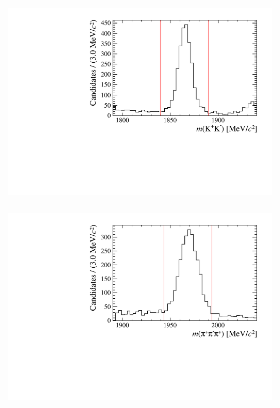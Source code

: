 \begin{figure}[!h]
   \begin{subfigure}[t]{1.0\textwidth}
   \centering
     \begin{subfigure}[t]{0.35\textwidth}
        \centering
        \includegraphics[width=1.0\textwidth]{figs/Selection/Phimass_PiPiPi_B2DsD0.pdf}
     \end{subfigure}
     \begin{subfigure}[t]{0.35\textwidth}
        \centering
        \includegraphics[width=1.0\textwidth]{figs/Selection/Dmass_PiPiPi_B2DsD0.pdf}
     \end{subfigure}
     \caption{\decay{\Dsp}{\pip\pim\pip}}
   \end{subfigure}   
   \begin{subfigure}[t]{1.0\textwidth}
   \centering
     \begin{subfigure}[t]{0.35\textwidth}

\end{subfigure}
\end{subfigure}
\end{figure}
